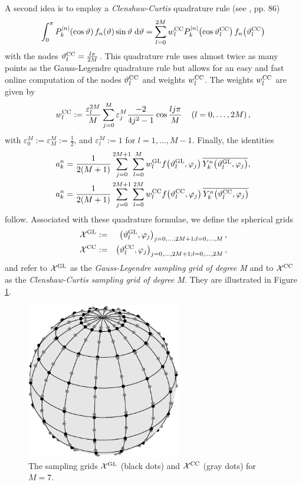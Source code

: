 A second idea is to employ a \emph{Clenshaw-Curtis} quadrature rule (see \cite{dara}, pp. 86)
\[
  \int_{0}^{\pi} P_{k}^{\left\vert n\right\vert}{\hspace{-0.4ex}}\left(\cos \vartheta\right) f_{n}{\hspace{-0.4ex}}\left(\vartheta\right) \sin \vartheta \; \text{\rm{d}} \vartheta = \sum_{l=0}^{2M} w_{l}^{\mbox{\scriptsize\rm{CC}}} P_{k}^{\left\vert n\right\vert}{\hspace{-0.4ex}}\left(\cos \vartheta_{l}^{\mbox{\scriptsize\rm{CC}}}\right) f_{n}{\hspace{-0.4ex}}\left(\vartheta_{l}^{\mbox{\scriptsize\rm{CC}}}\right)
\]
with the nodes $\vartheta_{l}^{\mbox{\scriptsize\rm{CC}}} = \frac{l\pi}{2M}$.
This quadrature rule uses almost twice as many points as the Gauss-Legendre quadrature rule but allows for an easy and fast online computation of the nodes $\vartheta_{l}^{\mbox{\scriptsize\rm{CC}}}$ and weights $w_{l}^{\mbox{\scriptsize\rm{CC}}}$. The weights $ w_{l}^{\mbox{\scriptsize\rm{CC}}}$ 
are given by
\[ 
  w_{l}^{\mbox{\scriptsize\rm{CC}}} := \frac{\varepsilon_{l}^{2M}}{M} \sum_{j=0}^{M}
  \varepsilon_{j}^{M} \frac{-2}{4j^2-1} \cos\frac{lj\pi}{M} 
  \quad \left(l=0,\ldots,2M\right),
\]
with $\varepsilon_{0}^{M} := \varepsilon_{M}^{M} := \frac{1}{2}$, and
$\varepsilon_{l}^{M} := 1$ for $l = 1,\ldots,M-1$.
Finally, the identities 
\begin{equation}
  \label{NFSFT:iDSFT2}
  \begin{split}
    a_{k}^n & = \frac{1}{2(M+1)} \sum_{j=0}^{2M+1} \sum_{l=0}^{M} w_{l}^{\mbox{\scriptsize\rm{GL}}} f{\hspace{-0.4ex}}\left(\vartheta_{l}^{\mbox{\scriptsize\rm{GL}}},\varphi_{j}\right) \overline{Y_{k}^n{\hspace{-0.4ex}}\left(\vartheta_{l}^{\mbox{\scriptsize\rm{GL}}},\varphi_{j}\right)},\\
    a_{k}^n & = \frac{1}{2(M+1)} \sum_{j=0}^{2M+1} \sum_{l=0}^{2M} w_{l}^{\mbox{\scriptsize\rm{CC}}} f{\hspace{-0.4ex}}\left(\vartheta_{l}^{\mbox{\scriptsize\rm{CC}}},\varphi_{j}\right) 
  \overline{Y_{k}^n{\hspace{-0.4ex}}\left(\vartheta_{l}^{\mbox{\scriptsize\rm{CC}}},\varphi_{j}\right)}
  \end{split}
\end{equation}
follow. Associated with these quadrature formulae, we define the spherical grids
\begin{eqnarray*}
  \mathcal{X}^{\mbox{\scriptsize\rm{GL}}} & := & \left(\vartheta_{l}^{\mbox{\scriptsize\rm{GL}}},\varphi_{j}\right)_{j=0,\dots,2M+1;l=0,\dots,M},\\
  \mathcal{X}^{\mbox{\scriptsize\rm{CC}}} & := & \left(\vartheta_{l}^{\mbox{\scriptsize\rm{CC}}},\varphi_{j}\right)_{j=0,\dots,2M+1;l=0,\dots,2M},
\end{eqnarray*}
and refer to $\mathcal{X}^{\mbox{\scriptsize\rm{GL}}}$ as the \emph{Gauss-Legendre sampling grid of degree M} and to $\mathcal{X}^{\mbox{\scriptsize\rm{CC}}}$ as the 
\emph{Clenshaw-Curtis sampling grid of degree M}. They are illustrated in Figure \ref{quadrature}.
\begin{figure}[tb]
  \centering
  \includegraphics[width=0.6\textwidth]{images/quadrature}
  \caption{The sampling grids $\mathcal{X}^{\mbox{\scriptsize\rm{GL}}}$ (black dots) and $\mathcal{X}^{\mbox{\scriptsize\rm{CC}}}$ (gray dots) for $M=7$.}
  \label{quadrature}
\end{figure}
